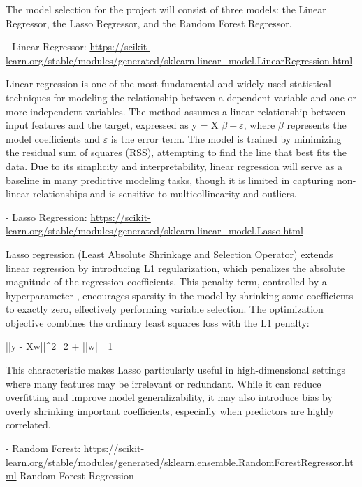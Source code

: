 \documentclass[12pt]{report} %
\begin{document}
The model selection for the project will consist of three models: the Linear Regressor, the Lasso Regressor, and the Random Forest Regressor.

- Linear Regressor: \url{https://scikit-learn.org/stable/modules/generated/sklearn.linear_model.LinearRegression.html}

Linear regression is one of the most fundamental and widely used statistical techniques for modeling the relationship between a dependent variable and one or more independent variables. The method assumes a linear relationship between input features and the target, expressed as y = X $\beta + \varepsilon $, where $\beta$ represents the model coefficients and $\varepsilon$ is the error term. The model is trained by minimizing the residual sum of squares (RSS), attempting to find the line that best fits the data. Due to its simplicity and interpretability, linear regression will serve as a baseline in many predictive modeling tasks, though it is limited in capturing non-linear relationships and is sensitive to multicollinearity and outliers.



- Lasso Regression: \url{https://scikit-learn.org/stable/modules/generated/sklearn.linear_model.Lasso.html}

Lasso regression (Least Absolute Shrinkage and Selection Operator) extends linear regression by introducing L1 regularization, which penalizes the absolute magnitude of the regression coefficients. This penalty term, controlled by a hyperparameter \alpha, encourages sparsity in the model by shrinking some coefficients to exactly zero, effectively performing variable selection. The optimization objective combines the ordinary least squares loss with the L1 penalty:

 ||y - Xw||^2_2 + \alpha ||w||_1

This characteristic makes Lasso particularly useful in high-dimensional settings where many features may be irrelevant or redundant. While it can reduce overfitting and improve model generalizability, it may also introduce bias by overly shrinking important coefficients, especially when predictors are highly correlated.


- Random Forest: \url{https://scikit-learn.org/stable/modules/generated/sklearn.ensemble.RandomForestRegressor.html}
Random Forest Regression
\end{document}
